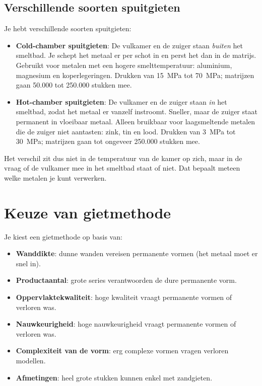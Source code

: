 \documentclass[a4paper,11pt,twoside]{report}
\begin{document}
\subsection{Verschillende soorten spuitgieten}
Je hebt verschillende soorten spuitgieten:
\begin{itemize}
    \item \textbf{Cold-chamber spuitgieten}: De vulkamer en de zuiger staan \emph{buiten} het smeltbad.
          Je schept het metaal er per schot in en perst het dan in de matrijs.
          Gebruikt voor metalen met een hogere smelttemperatuur: aluminium, magnesium en koperlegeringen.
          Drukken van \SI{15}{MPa} tot \SI{70}{MPa}; matrijzen gaan 50.000 tot 250.000 stukken mee.
    \item \textbf{Hot-chamber spuitgieten}: De vulkamer en de zuiger staan \emph{in} het smeltbad,
          zodat het metaal er vanzelf instroomt. Sneller, maar de zuiger staat permanent in vloeibaar metaal.
          Alleen bruikbaar voor laagsmeltende metalen die de zuiger niet aantasten: zink, tin en lood.
          Drukken van \SI{3}{MPa} tot \SI{30}{MPa}; matrijzen gaan tot ongeveer 250.000 stukken mee.
\end{itemize}

Het verschil zit dus niet in de temperatuur van de kamer op zich, maar in de vraag of de vulkamer
mee in het smeltbad staat of niet. Dat bepaalt meteen welke metalen je kunt verwerken.



\section{Keuze van gietmethode}
Je kiest een gietmethode op basis van:
\begin{itemize}
    \item \textbf{Wanddikte}: dunne wanden vereisen permanente vormen (het metaal moet er snel in).
    \item \textbf{Productaantal}: grote series verantwoorden de dure permanente vorm.
    \item \textbf{Oppervlaktekwaliteit}: hoge kwaliteit vraagt permanente vormen of verloren was.
    \item \textbf{Nauwkeurigheid}: hoge nauwkeurigheid vraagt permanente vormen of verloren was.
    \item \textbf{Complexiteit van de vorm}: erg complexe vormen vragen verloren modellen.
    \item \textbf{Afmetingen}: heel grote stukken kunnen enkel met zandgieten.
\end{itemize}
\end{document}
